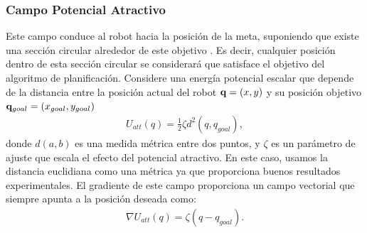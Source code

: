 \subsubsection{Campo Potencial Atractivo}
Este campo conduce al robot hacia la posición de la meta, suponiendo que existe una 
sección circular  alrededor de este objetivo \cite{koren1991potential}. Es decir, 
cualquier posición dentro de esta sección circular se considerará que satisface el 
objetivo del algoritmo de planificación. Considere una energía potencial escalar 
que depende de la distancia entre la posición actual del robot $\mathbf q=(x,y)$ y su 
posición objetivo $\mathbf q_{goal} = (x_{goal}, y_{goal})$
\begin{align}
\label{eqn:pot_attr}
U_{att}(q) = \frac{1}{2}\zeta d^{2} (q,q_{goal}),
\end{align}
donde $d(a,b)$ es una medida métrica entre dos puntos, y $\zeta$ es un 
parámetro de ajuste que escala el efecto del potencial atractivo. En este 
caso, usamos la distancia euclidiana como una métrica ya que proporciona 
buenos resultados experimentales. El gradiente de este campo proporciona un 
campo vectorial que siempre apunta a la posición deseada como:
\begin{align}
\label{eqn:gradient_att}
\nabla U_{att}(q)=\zeta(q-q_{goal}).
\end{align}

